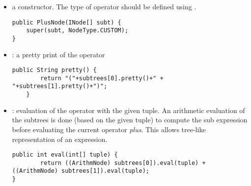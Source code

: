 \begin{itemize}
\item a constructor. The type of operator should be defined using .
\begin{lstlisting}
public PlusNode(INode[] subt) {
	super(subt, NodeType.CUSTOM);
}
\end{lstlisting}
\item  {} : a pretty print of the operator
\begin{lstlisting}
public String pretty() {
        return "("+subtrees[0].pretty()+" + "+subtrees[1].pretty()+")";
    }
\end{lstlisting}

\item  {} : evaluation of the operator with the given tuple. An arithmetic evaluation of the subtrees is done (based on the given tuple) to compute the sub expression before evaluating the current operator \textit{plus}. This allows tree-like representation of an expression.
\begin{lstlisting}
public int eval(int[] tuple) {
		return ((ArithmNode) subtrees[0]).eval(tuple) + ((ArithmNode) subtrees[1]).eval(tuple);
}
\end{lstlisting}
\end{itemize}


